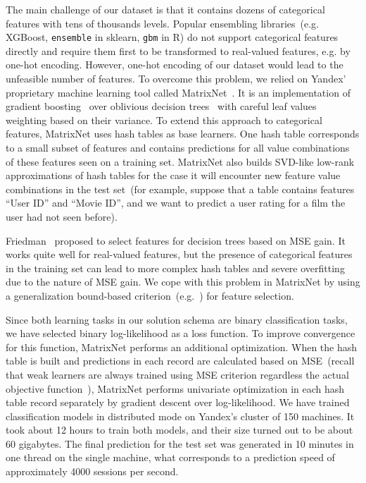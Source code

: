 \documentclass{sig-alternate}
\begin{document}
The main challenge of our dataset is that it contains
dozens of categorical features with tens of thousands levels.
Popular ensembling libraries~(e.g. XGBoost, \texttt{ensemble} in sklearn, \texttt{gbm} in R)
do not support categorical features directly
and require them first to be transformed to real-valued features, e.g. by one-hot encoding.
However, one-hot encoding of our dataset would lead to the unfeasible number of features.
To overcome this problem, we relied on Yandex' proprietary machine learning
tool called MatrixNet~\cite{mxnetslides}.
It is an implementation of gradient boosting~\cite{friedman00greedyfunction}
over oblivious decision trees~\cite{kohavi95odt} with careful leaf values weighting based
on their variance.
To extend this approach to categorical features, MatrixNet uses hash tables as base learners.
One hash table corresponds to a small subset of features
and contains predictions for all value combinations of these features seen on a training set.
MatrixNet also builds SVD-like low-rank approximations%
of hash tables for the case
it will encounter new feature value combinations in the test set~(for example, suppose that a table
contains features ``User ID'' and ``Movie ID'', and we want to predict
a user rating for a film the user had not seen before).

Friedman~\cite{friedman00greedyfunction} proposed to select features
for decision trees based on MSE gain.
It works quite well for real-valued features, but the presence of categorical features
in the training set can lead to more complex hash tables and severe overfitting due to the nature of MSE gain.
We cope with this problem in MatrixNet by using a generalization bound-based criterion~(e.g.~\cite{tolstikhin13pacbayes})
for feature selection.

Since both learning tasks in our solution schema are binary classification tasks,
we have selected binary log-likelihood as a loss function.
To improve convergence for this function, MatrixNet performs an additional optimization.
When the hash table is built and predictions in each record
are calculated based on MSE~(recall that weak learners are always trained using MSE criterion
regardless the actual objective function~\cite{friedman00greedyfunction}),
MatrixNet performs univariate optimization in each hash table record separately by gradient descent over log-likelihood.
We have trained classification models in distributed mode on Yandex's cluster of 150 machines.
It took about 12 hours to train both models, and their size turned out to be about 60 gigabytes.
The final prediction for the test set was generated in 10 minutes in one thread on the single machine,
what corresponds to a prediction speed of approximately 4000 sessions per second.
\end{document}
